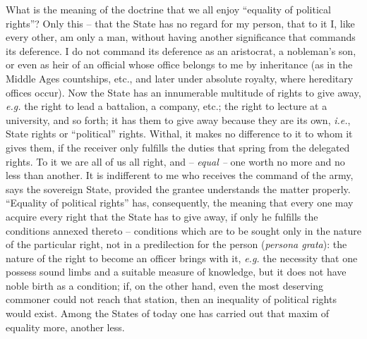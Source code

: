 What is the meaning of the doctrine that we all enjoy ``equality of political 
rights''? Only this -- that the State has no regard for my person, that to it 
I, like every other, am only a man, without having another significance that 
commands its deference. I do not command its deference as an aristocrat, a 
nobleman's son, or even as heir of an official whose office belongs to me by 
inheritance (as in the Middle Ages countships, etc., and later under absolute 
royalty, where hereditary offices occur). Now the State has an innumerable 
multitude of rights to give away, \textit{e.g.} the right to lead a 
battalion, a company, etc.; the right to lecture at a university, and so 
forth; it has them to give away because they are its own, \textit{i.e.}, State 
rights or ``political'' rights. Withal, it makes no difference to it to whom 
it gives them, if the receiver only fulfills the duties that spring from the 
delegated rights. To it we are all of us all right, and -- \textit{equal --} 
one worth no more and no less than another. It is indifferent to me who 
receives the command of the army, says the sovereign State, provided the 
grantee understands the matter properly. ``Equality of political rights'' 
has, consequently, the meaning that every one may acquire every right that the 
State has to give away, if only he fulfills the conditions annexed thereto -- 
conditions which are to be sought only in the nature of the particular right, 
not in a predilection for the person (\textit{persona grata}): the nature of 
the right to become an officer brings with it, \textit{e.g.} the necessity 
that one possess sound limbs and a suitable measure of knowledge, but it does 
not have noble birth as a condition; if, on the other hand, even the most 
deserving commoner could not reach that station, then an inequality of 
political rights would exist. Among the States of today one has carried out 
that maxim of equality more, another less.


